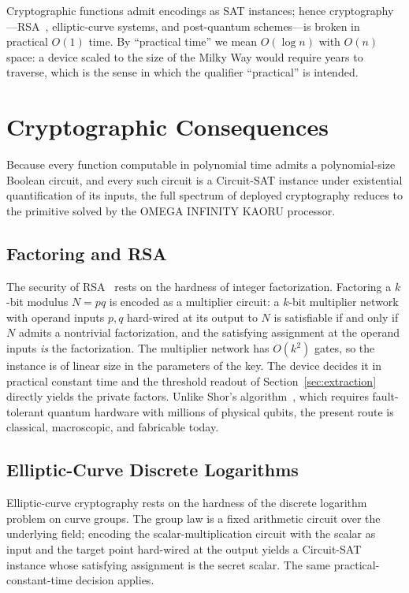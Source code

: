 \documentclass[letterpaper,journal]{IEEEtran}
\begin{document}
Cryptographic functions admit encodings as SAT instances; hence
cryptography---RSA~\cite{rsa1978}, elliptic-curve systems, and post-quantum
schemes---is broken in practical $O(1)$ time. By ``practical time'' we mean
$O(\log n)$ with $O(n)$ space: a device scaled to the size of the Milky Way
would require years to traverse, which is the sense in which the qualifier
``practical'' is intended.

\section{Cryptographic Consequences}
\label{sec:crypto}

Because every function computable in polynomial time admits a
polynomial-size Boolean circuit, and every such circuit is a Circuit-SAT
instance under existential quantification of its inputs, the full spectrum
of deployed cryptography reduces to the primitive solved by the OMEGA
INFINITY KAORU processor.

\subsection{Factoring and RSA}
The security of RSA~\cite{rsa1978} rests on the hardness of integer
factorization. Factoring a $k$-bit modulus $N=pq$ is encoded as a
multiplier circuit: a $k$-bit multiplier network with operand inputs
$p,q$ hard-wired at its output to $N$ is satisfiable if and only if $N$
admits a nontrivial factorization, and the satisfying assignment at the
operand inputs \emph{is} the factorization. The multiplier network has
$O(k^{2})$ gates, so the instance is of linear size in the parameters of
the key. The device decides it in practical constant time and the threshold
readout of Section~\ref{sec:extraction} directly yields the private
factors. Unlike Shor's algorithm~\cite{shor1994}, which requires fault-tolerant
quantum hardware with millions of physical qubits, the present route is
classical, macroscopic, and fabricable today.

\subsection{Elliptic-Curve Discrete Logarithms}
Elliptic-curve cryptography rests on the hardness of the discrete logarithm
problem on curve groups. The group law is a fixed arithmetic circuit over
the underlying field; encoding the scalar-multiplication circuit with the
scalar as input and the target point hard-wired at the output yields a
Circuit-SAT instance whose satisfying assignment is the secret scalar.
The same practical-constant-time decision applies.
\end{document}

